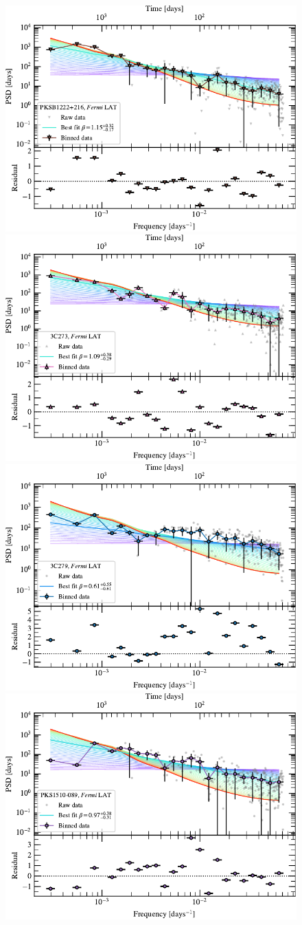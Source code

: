 \documentclass[twocolumn]{aastex62}
\begin{document}
\begin{figure}
    \centering
    \includegraphics[width = 0.45\linewidth]{figures/periodogram_fermi_PKSB1222+216_Nsim_100Next_100Sim_addunc_data_rescale_EM13_usegap_1_PSD_window_none_detrend_none_norm_rms.pdf}
    \includegraphics[width = 0.45\linewidth]{figures/periodogram_fermi_3C273_Nsim_100Next_100Sim_addunc_data_rescale_EM13_usegap_1_PSD_window_none_detrend_none_norm_rms.pdf}
    \includegraphics[width = 0.45\linewidth]{figures/periodogram_fermi_3C279_Nsim_100Next_100Sim_addunc_data_rescale_EM13_usegap_1_PSD_window_none_detrend_none_norm_rms.pdf}
    \includegraphics[width = 0.45\linewidth]{figures/periodogram_fermi_PKS1510-089_Nsim_100Next_100Sim_addunc_data_rescale_EM13_usegap_1_PSD_window_none_detrend_none_norm_rms.pdf}

\end{figure}
\end{document}
